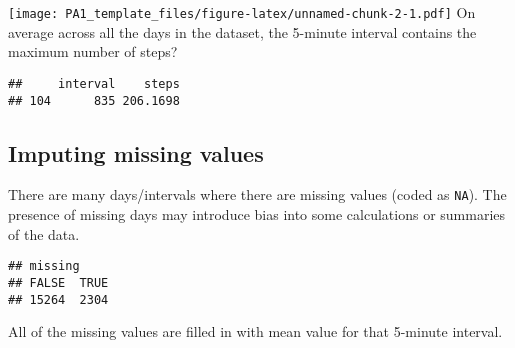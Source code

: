 \documentclass[
]{article}
\newenvironment{Shaded}{\begin{snugshade}}{\end{snugshade}}
\newcommand{\CommentTok}[1]{\textcolor[rgb]{0.56,0.35,0.01}{\textit{#1}}}
\newcommand{\ConstantTok}[1]{\textcolor[rgb]{0.00,0.00,0.00}{#1}}
\newcommand{\ControlFlowTok}[1]{\textcolor[rgb]{0.13,0.29,0.53}{\textbf{#1}}}
\newcommand{\FunctionTok}[1]{\textcolor[rgb]{0.00,0.00,0.00}{#1}}
\newcommand{\NormalTok}[1]{#1}
\newcommand{\OtherTok}[1]{\textcolor[rgb]{0.56,0.35,0.01}{#1}}
\newcommand{\SpecialCharTok}[1]{\textcolor[rgb]{0.00,0.00,0.00}{#1}}
\newcommand{\StringTok}[1]{\textcolor[rgb]{0.31,0.60,0.02}{#1}}
\begin{document}
\texttt{[image: PA1\_template\_files/figure-latex/unnamed-chunk-2-1.pdf]}
On average across all the days in the dataset, the 5-minute interval
contains the maximum number of steps?
\begin{Shaded}
\end{Shaded}
\begin{verbatim}
##     interval    steps
## 104      835 206.1698
\end{verbatim}
\hypertarget{imputing-missing-values}{%
\subsection{Imputing missing values}\label{imputing-missing-values}}
There are many days/intervals where there are missing values (coded as
\texttt{NA}). The presence of missing days may introduce bias into some
calculations or summaries of the data.
\begin{Shaded}
\end{Shaded}
\begin{verbatim}
## missing
## FALSE  TRUE 
## 15264  2304
\end{verbatim}
All of the missing values are filled in with mean value for that
5-minute interval.
\begin{Shaded}
\end{Shaded}
\end{document}
